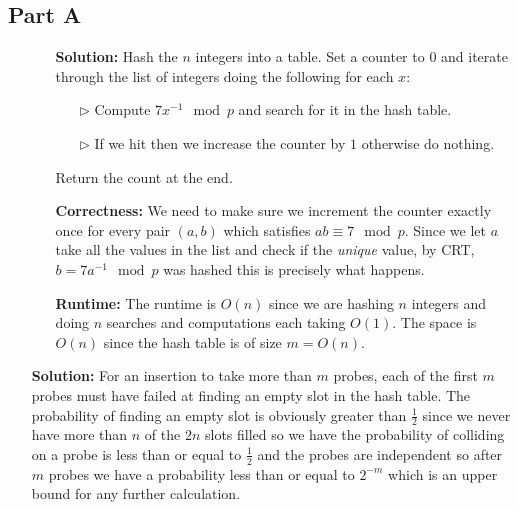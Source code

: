 \documentclass[12pt,twoside]{article}
\begin{document}
\begin{problems}
\section*{Part A}
\problem
\begin{itemize}
\item[]
\begin{itemize}
\item [\textbf{Solution:} ] Hash the $n$ integers into a table. Set a counter to $0$ and iterate through the list of integers doing the following for each $x$:
\begin{itemize}
\item [$\rhd$ ] Compute $7x^{-1} \mod p$ and search for it in the hash table.
\item [$\rhd$ ] If we hit then we increase the counter by $1$ otherwise do nothing.
\end{itemize}
Return the count at the end.
\end{itemize}
\begin{itemize}
\item [\textbf{Correctness:} ] We need to make sure we increment the counter exactly once for every pair $(a,b)$ which satisfies $ab \equiv 7 \mod p$. Since we let $a$ take all the values in the list and check if the \emph{unique} value, by CRT, $b=7a^{-1}\mod p$ was hashed this is precisely what happens. 
\end{itemize}
\begin{itemize}
\item [\textbf{Runtime:} ] The runtime is $O(n)$ since we are hashing $n$ integers and doing $n$ searches and computations each taking $O(1)$.  The space is $O(n)$ since the hash table is of size $m=O(n)$.
\end{itemize}
\end{itemize}
\problem
\begin{problemparts}
\problempart
\begin{itemize}
\item [\textbf{Solution:} ] For an insertion to take more than $m$ probes, each of the first $m$ probes must have failed at finding an empty slot in the hash table. The probability of finding an empty slot is obviously greater than $\frac{1}{2}$ since we never have more than $n$ of the $2n$ slots filled so we have the probability of colliding on a probe is less than or equal to $\frac{1}{2}$ and the probes are independent so after $m$ probes we have a probability less than or equal to $2^{-m}$ which is an upper bound for any further calculation.

\end{itemize}
\end{problemparts}
\end{problems}
\end{document}
